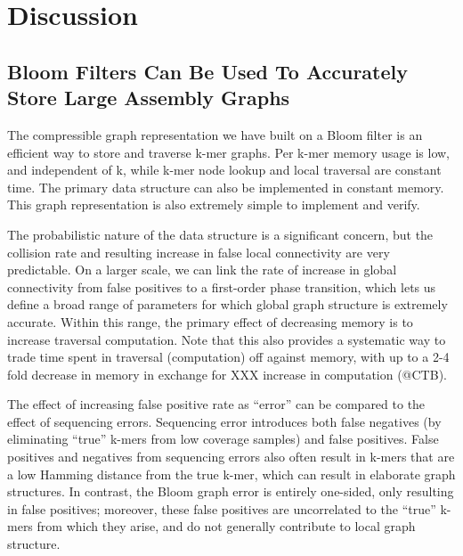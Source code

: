 \documentclass[12pt]{article} \usepackage{simplemargins}
\begin{document}
\section{Discussion}

\subsection{Bloom Filters Can Be Used To Accurately Store Large Assembly Graphs}
The compressible graph representation we have built on a Bloom filter
is an efficient way to store and traverse k-mer graphs.  Per k-mer
memory usage is low, and independent of k, while k-mer node lookup and
local traversal are constant time.  The primary data structure can
also be implemented in constant memory.  This graph representation is
also extremely simple to implement and verify.

The probabilistic nature of the data structure is a significant
concern, but the collision rate and resulting increase in false local
connectivity are very predictable.  On a larger scale, we can link the
rate of increase in global connectivity from false positives to a
first-order phase transition, which lets us define a broad range of
parameters for which global graph structure is extremely accurate.
Within this range, the primary effect of decreasing memory is to increase
traversal computation.  Note that this also provides a systematic way
to trade time spent in traversal (computation) off against memory,
with up to a 2-4 fold decrease in memory in exchange for XXX increase
in computation (@CTB).

The effect of increasing false positive rate as ``error'' can be
compared to the effect of sequencing errors.  Sequencing error
introduces both false negatives (by eliminating ``true'' k-mers from
low coverage samples) and false positives.  False positives and
negatives from sequencing errors also often result in k-mers that are
a low Hamming distance from the true k-mer, which can result in
elaborate graph structures.  In contrast, the Bloom graph error is
entirely one-sided, only resulting in false positives; moreover, these
false positives are uncorrelated to the ``true'' k-mers from which
they arise, and do not generally contribute to local graph structure.
\end{document}
